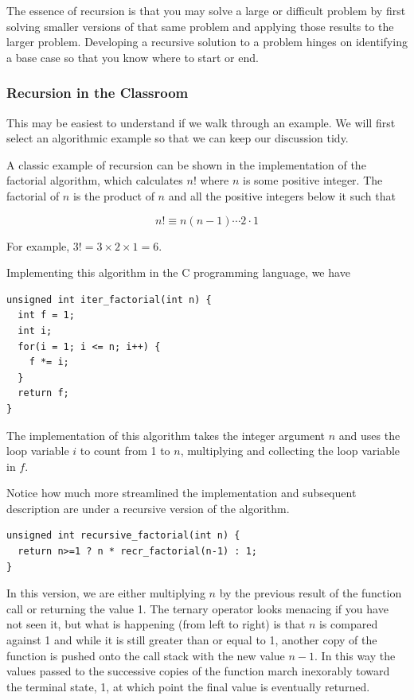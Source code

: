 \documentclass[jou,apacite]{apa6}
\begin{document}
    The essence of recursion is that you may solve a large or difficult problem by first solving smaller versions of that same problem and applying those results to the larger problem.  Developing a recursive solution to a problem hinges on identifying a base case so that you know where to start or end. 

\subsubsection{Recursion in the Classroom}   %
This may be easiest to understand if we walk through an example.  We will first select an algorithmic example so that we can keep our discussion tidy.

A classic example of recursion can be shown in the implementation of the factorial algorithm, which calculates $n!$ where $n$ is some positive integer.  The factorial of $n$ is the product of $n$ and all the positive integers below it such that  

\[n!\equiv n(n-1)\cdots 2\cdot 1\]

For example, $3! = 3\times2\times1 = 6$.

Implementing this algorithm in the C programming language, we have
\begin{verbatim}
unsigned int iter_factorial(int n) {
  int f = 1;
  int i;
  for(i = 1; i <= n; i++) {
    f *= i;
  }
  return f;
}
\end{verbatim}
The implementation of this algorithm takes the integer argument $n$ and uses the loop variable $i$ to count from 1 to $n$, multiplying and collecting the loop variable in $f$.

Notice how much more streamlined the implementation and subsequent description are under a recursive version of the algorithm.
\begin{verbatim}
unsigned int recursive_factorial(int n) {
  return n>=1 ? n * recr_factorial(n-1) : 1;
}
\end{verbatim}
In this version, we are either multiplying $n$ by the previous result of the function call or returning the value 1.  The ternary operator looks menacing if you have not seen it, but what is happening (from left to right) is that $n$ is compared against 1 and while it is still greater than or equal to 1, another copy of the function is pushed onto the call stack with the new value $n-1$.  In this way the values passed to the successive copies of the function march inexorably toward
the terminal state, 1, at which point the final value is eventually returned.
\end{document}
